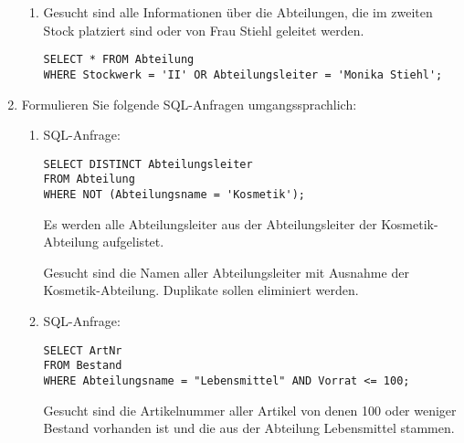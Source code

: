 \documentclass{lehramt-informatik-aufgabe}
\begin{document}
\begin{enumerate}
\begin{enumerate}

\item Gesucht sind alle Informationen über die Abteilungen, die im
zweiten Stock platziert sind oder von Frau Stiehl geleitet werden.

\begin{antwort}[muster]
\begin{verbatim}
SELECT * FROM Abteilung
WHERE Stockwerk = 'II' OR Abteilungsleiter = 'Monika Stiehl';
\end{verbatim}
\end{antwort}

\end{enumerate}


\item Formulieren Sie folgende SQL-Anfragen umgangssprachlich:

\begin{enumerate}


\item SQL-Anfrage:

\begin{verbatim}
SELECT DISTINCT Abteilungsleiter
FROM Abteilung
WHERE NOT (Abteilungsname = 'Kosmetik');
\end{verbatim}

\begin{antwort}[richtig]
Es werden alle Abteilungsleiter aus der Abteilungsleiter der
Kosmetik-Abteilung aufgelistet.
\end{antwort}

\begin{antwort}[muster]
Gesucht sind die Namen aller Abteilungsleiter mit Ausnahme der
Kosmetik-Abteilung. Duplikate sollen eliminiert werden.
\end{antwort}


\item SQL-Anfrage:

\begin{verbatim}
SELECT ArtNr
FROM Bestand
WHERE Abteilungsname = "Lebensmittel" AND Vorrat <= 100;
\end{verbatim}

\begin{antwort}[richtig]
Gesucht sind die Artikelnummer aller Artikel von denen 100 oder weniger
Bestand vorhanden ist und die aus der Abteilung Lebensmittel stammen.
\end{antwort}


\end{enumerate}
\end{enumerate}
\end{document}

